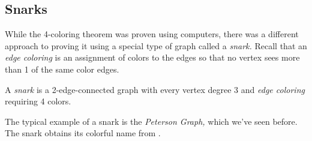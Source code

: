 \subsection{Snarks}
While the 4-coloring theorem was proven using computers, there was a different approach to proving it using a special type of graph called a \emph{snark.} Recall that an \emph{edge coloring} is an assignment of colors to the edges so that no vertex sees more than 1 of the same color edges. 
\begin{definition}[snark]
 A \emph{snark} is a 2-edge-connected graph with every vertex degree 3 and \emph{edge coloring} requiring 4 colors. 
\end{definition}
The typical example of a snark is the \emph{Peterson Graph,} which we've seen before. The snark obtains its colorful name from \cite{gardner1976snarks}.

